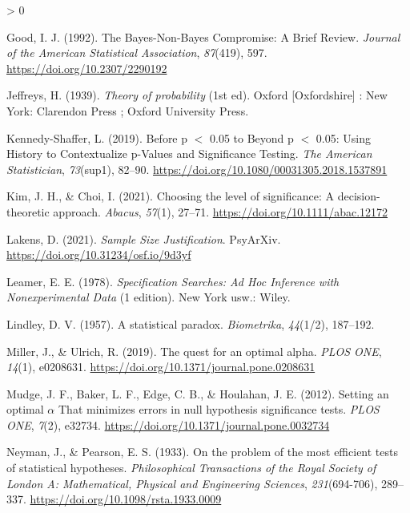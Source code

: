 \documentclass[
  english,
  ,jou, a4paper,floatsintext]{apa6}
\newlength{\cslhangindent}
\newenvironment{CSLReferences}[2] %
 {%
  \setlength{\parindent}{0pt}
  \ifodd #1 \everypar{\setlength{\hangindent}{\cslhangindent}}\ignorespaces\fi
  \ifnum #2 > 0
  \setlength{\parskip}{#2\baselineskip}
  \fi
 }%
 {}
\begin{document}
\begin{CSLReferences}{1}{0}
\leavevmode\hypertarget{ref-good_bayes-non-bayes_1992}{}%
Good, I. J. (1992). The {Bayes}-{Non}-{Bayes Compromise}: {A Brief Review}. \emph{Journal of the American Statistical Association}, \emph{87}(419), 597. \url{https://doi.org/10.2307/2290192}

\leavevmode\hypertarget{ref-jeffreys_theory_1939}{}%
Jeffreys, H. (1939). \emph{Theory of probability} (1st ed). {Oxford {[}Oxfordshire{]} : New York}: {Clarendon Press ; Oxford University Press}.

\leavevmode\hypertarget{ref-kennedy-shaffer_before_2019}{}%
Kennedy-Shaffer, L. (2019). Before p {\(<\)} 0.05 to {Beyond} p {\(<\)} 0.05: {Using History} to {Contextualize} p-{Values} and {Significance Testing}. \emph{The American Statistician}, \emph{73}(sup1), 82--90. \url{https://doi.org/10.1080/00031305.2018.1537891}

\leavevmode\hypertarget{ref-kim2021choosing}{}%
Kim, J. H., \& Choi, I. (2021). Choosing the level of significance: A decision-theoretic approach. \emph{Abacus}, \emph{57}(1), 27--71. \url{https://doi.org/10.1111/abac.12172}

\leavevmode\hypertarget{ref-lakens_sample_2021}{}%
Lakens, D. (2021). \emph{Sample {Size} {Justification}}. PsyArXiv. \url{https://doi.org/10.31234/osf.io/9d3yf}

\leavevmode\hypertarget{ref-leamer_specification_1978}{}%
Leamer, E. E. (1978). \emph{Specification {Searches}: {Ad Hoc Inference} with {Nonexperimental Data}} (1 edition). {New York usw.}: {Wiley}.

\leavevmode\hypertarget{ref-lindley_statistical_1957}{}%
Lindley, D. V. (1957). A statistical paradox. \emph{Biometrika}, \emph{44}(1/2), 187--192.

\leavevmode\hypertarget{ref-miller_quest_2019}{}%
Miller, J., \& Ulrich, R. (2019). The quest for an optimal alpha. \emph{PLOS ONE}, \emph{14}(1), e0208631. \url{https://doi.org/10.1371/journal.pone.0208631}

\leavevmode\hypertarget{ref-mudge_setting_2012}{}%
Mudge, J. F., Baker, L. F., Edge, C. B., \& Houlahan, J. E. (2012). Setting an optimal {\(\alpha\)} {That minimizes errors} in {null hypothesis significance tests}. \emph{PLOS ONE}, \emph{7}(2), e32734. \url{https://doi.org/10.1371/journal.pone.0032734}

\leavevmode\hypertarget{ref-neyman_problem_1933}{}%
Neyman, J., \& Pearson, E. S. (1933). On the problem of the most efficient tests of statistical hypotheses. \emph{Philosophical Transactions of the Royal Society of London A: Mathematical, Physical and Engineering Sciences}, \emph{231}(694-706), 289--337. \url{https://doi.org/10.1098/rsta.1933.0009}


\end{CSLReferences}
\end{document}
